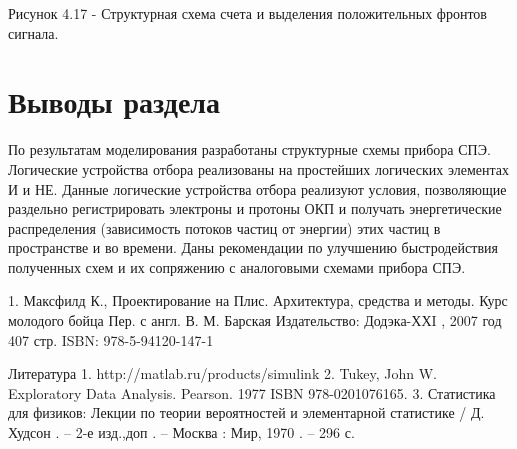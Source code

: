 Рисунок 4.17 - Структурная схема счета и выделения положительных фронтов сигнала.


\section{Выводы раздела}
По результатам моделирования разработаны  структурные схемы прибора СПЭ.  Логические устройства отбора реализованы  на простейших логических элементах И и НЕ. Данные логические устройства отбора реализуют условия, позволяющие раздельно регистрировать электроны и протоны ОКП и получать энергетические распределения (зависимость потоков частиц от энергии) этих частиц в пространстве и во времени. Даны рекомендации по улучшению быстродействия полученных схем и их сопряжению с аналоговыми схемами прибора СПЭ.

1.	Максфилд К., Проектирование на Плис. Архитектура, средства и методы. Курс молодого бойца Пер. с англ. В. М. Барская Издательство: Додэка-ХХI , 2007 год 407 стр. ISBN: 978-5-94120-147-1


Литература
1.	http://matlab.ru/products/simulink
2.	Tukey, John W. Exploratory Data Analysis. Pearson. 1977 ISBN 978-0201076165.
3.	Статистика для физиков: Лекции по теории вероятностей и элементарной статистике / Д. Худсон . – 2-е изд.,доп . – Москва : Мир, 1970 . – 296 с.

